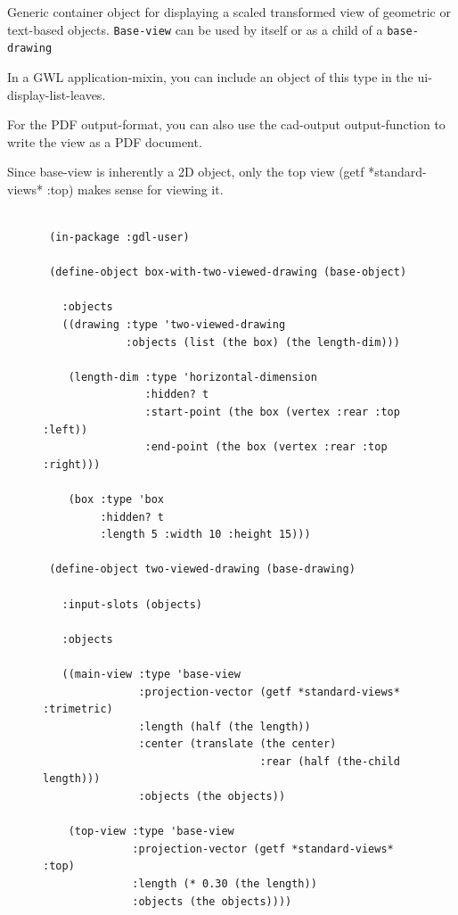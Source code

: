 \documentclass [11pt]{book}
\begin{document}
\begin{itemize}
\begin{description}
Generic container object for displaying a scaled transformed view of geometric or 
text-based objects. \texttt{Base-view} can be used by itself or as a child of a \texttt{base-drawing}

In a GWL application-mixin, you can include an object of this type in the ui-display-list-leaves.

For the PDF output-format, you can also use the cad-output output-function to write the 
view as a PDF document. 

Since base-view is inherently a 2D object, only the top view (getf *standard-views* :top) 
makes sense for viewing it.



\end{description}




\begin{figure}
\begin{lrbox}{\boxedverb}
\begin{minipage}{\linewidth}
{\small

\begin{verbatim}
                 
 (in-package :gdl-user)

 (define-object box-with-two-viewed-drawing (base-object)
  
   :objects
   ((drawing :type 'two-viewed-drawing
             :objects (list (the box) (the length-dim)))
    
    (length-dim :type 'horizontal-dimension
                :hidden? t
                :start-point (the box (vertex :rear :top :left))
                :end-point (the box (vertex :rear :top :right)))
   
    (box :type 'box
         :hidden? t
         :length 5 :width 10 :height 15)))

 (define-object two-viewed-drawing (base-drawing)
   
   :input-slots (objects)
   
   :objects
  
   ((main-view :type 'base-view
               :projection-vector (getf *standard-views* :trimetric)
               :length (half (the length))
               :center (translate (the center)
                                  :rear (half (the-child length)))
               :objects (the objects))
   
    (top-view :type 'base-view
              :projection-vector (getf *standard-views* :top)
              :length (* 0.30 (the length))
              :objects (the objects))))


\end{verbatim}}
\end{minipage}
\end{lrbox}
\end{figure}
\end{itemize}
\end{document}

